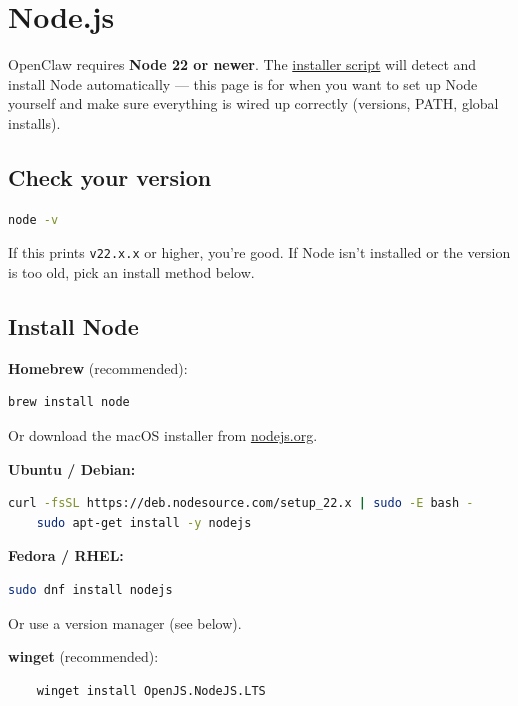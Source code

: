 \section{Node.js}


OpenClaw requires \textbf{Node 22 or newer}. The \href{/install\#install-methods}{installer script} will detect and install Node automatically — this page is for when you want to set up Node yourself and make sure everything is wired up correctly (versions, PATH, global installs).

\subsection{Check your version}


\begin{lstlisting}[language=bash]
node -v
\end{lstlisting}


If this prints \texttt{v22.x.x} or higher, you're good. If Node isn't installed or the version is too old, pick an install method below.

\subsection{Install Node}


\textbf{Homebrew} (recommended):

\begin{lstlisting}[language=bash]
    brew install node
\end{lstlisting}


Or download the macOS installer from \href{https://nodejs.org/}{nodejs.org}.

\textbf{Ubuntu / Debian:}

\begin{lstlisting}[language=bash]
    curl -fsSL https://deb.nodesource.com/setup_22.x | sudo -E bash -
    sudo apt-get install -y nodejs
\end{lstlisting}


\textbf{Fedora / RHEL:}

\begin{lstlisting}[language=bash]
    sudo dnf install nodejs
\end{lstlisting}


Or use a version manager (see below).

\textbf{winget} (recommended):

\begin{lstlisting}
    winget install OpenJS.NodeJS.LTS
\end{lstlisting}


